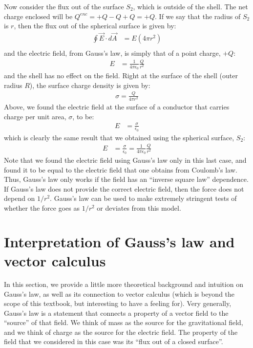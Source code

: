 Now consider the flux out of the surface $S_2$, which is outside of the shell. The net charge enclosed will be $Q^{enc}=+Q-Q+Q=+Q$. If we say that the radius of $S_2$ is $r$,  then the flux out of the spherical surface is given by:
\begin{align*}
\oint \vec E\cdot d\vec A &= E(4\pi r^2)\\
\end{align*}
and the electric field, from Gauss's law, is simply that of a point charge, $+Q$:
\begin{align*}
E&=\frac{1}{4\pi\epsilon_0}\frac{Q}{r^2}
\end{align*}
and the shell has no effect on the field. Right at the surface of the shell (outer radius $R$), the surface charge density is given by:
\begin{align*}
\sigma=\frac{Q}{4\pi r^2}
\end{align*}
Above, we found the electric field at the surface of a conductor that carries charge per unit area, $\sigma$, to be:
\begin{align*}
E&= \frac{\sigma}{\epsilon_0}
\end{align*}
which is clearly the same result that we obtained using the spherical surface, $S_2$:
\begin{align*}
E&= \frac{\sigma}{\epsilon_0}=\frac{1}{4\pi\epsilon_0}\frac{Q}{r^2}
\end{align*}
Note that we found the electric field using Gauss's law only in this last case, and found it to be equal to the electric field that one obtains from Coulomb's law. Thus, Gauss's law only works if the field has an ``inverse square law'' dependence. If Gauss's law does not provide the correct electric field, then the force does not depend on $1/r^2$. Gauss's law can be used to make extremely stringent tests of whether the force goes as $1/r^2$ or deviates from this model.

\section{Interpretation of Gauss's law and vector calculus}
\label{sec:gauss:interpretation}
In this section, we provide a little more theoretical background and intuition on Gauss's law, as well as its connection to vector calculus (which is beyond the scope of this textbook, but interesting to have a feeling for). Very generally, Gauss's law is a statement that connects a property of a vector field to the ``source'' of that field. We think of mass as the source for the gravitational field, and we think of charge as the source for the electric field. The property of the field that we considered in this case was its ``flux out of a closed surface''.

